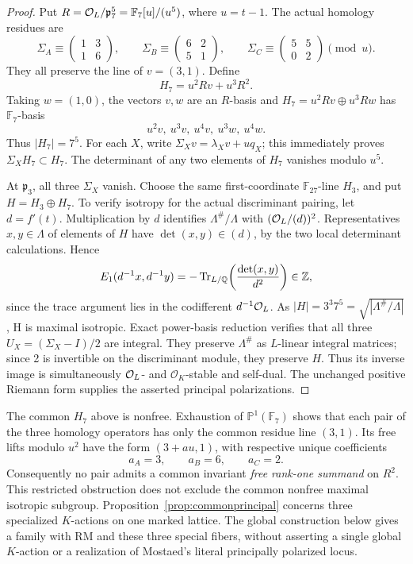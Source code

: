 \begin{proof}
Put $R=\mathcal O_L/\mathfrak p_7^5=\mathbb F_7[u]/(u^5)$, where $u=t-1$.
The actual homology residues are
\[
 \Sigma_A\equiv\begin{pmatrix}1&3\\1&6\end{pmatrix},\qquad
 \Sigma_B\equiv\begin{pmatrix}6&2\\5&1\end{pmatrix},\qquad
 \Sigma_C\equiv\begin{pmatrix}5&5\\0&2\end{pmatrix}\pmod u.
\]
They all preserve the line of $v=(3,1)$. Define
\[
 H_7=u^2Rv+u^3R^2.
\]
Taking $w=(1,0)$, the vectors $v,w$ are an $R$-basis and
$H_7=u^2Rv\oplus u^3Rw$ has $\mathbb F_7$-basis
\[
 u^2v,\ u^3v,\ u^4v,\ u^3w,\ u^4w.
\]
Thus $|H_7|=7^5$.
For each $X$, write $\Sigma_Xv=\lambda_Xv+uq_X$; this immediately proves
$\Sigma_XH_7\subset H_7$. The determinant of any two elements of $H_7$
vanishes modulo $u^5$.

At $\mathfrak p_3$, all three $\Sigma_X$ vanish. Choose the same
first-coordinate $\mathbb F_{27}$-line $H_3$, and put $H=H_3\oplus H_7$.
To verify isotropy for the actual discriminant pairing, let $d=f'(t)$.
Multiplication by $d$ identifies $\Lambda^\#/\Lambda$ with
$(\mathcal O_L/(d))^2$. Representatives $x,y\in\Lambda$ of elements of $H$ have
$\det(x,y)\in(d)$, by the two local determinant calculations. Hence
\[
 E_1(d^{-1}x,d^{-1}y)
 =-\operatorname{Tr}_{L/\mathbb Q}\!\left(\frac{\det(x,y)}{d^2}\right)
 \in\mathbb Z,
\]
since the trace argument lies in the codifferent $d^{-1}\mathcal O_L$.
As $|H|=3^3 7^5=\sqrt{|\Lambda^\#/\Lambda|}$, H is maximal isotropic.
Exact power-basis reduction verifies that all three
$U_X=(\Sigma_X-I)/2$ are integral. They preserve $\Lambda^\#$ as
$L$-linear integral matrices; since 2 is invertible on the discriminant
module, they preserve $H$. Thus its inverse image is simultaneously
$\mathcal O_L$- and $\mathcal O_K$-stable and self-dual. The unchanged positive
Riemann form supplies the asserted principal polarizations.
\end{proof}

\begin{remark}\label{rem:ABprincipallevels}
The common $H_7$ above is nonfree. Exhaustion of $\mathbb P^1(\mathbb F_7)$
shows that each pair of the three homology operators has only the common
residue line $(3,1)$. Its free lifts modulo $u^2$ have the form
$(3+au,1)$, with respective unique coefficients
\[
 a_A=3,\qquad a_B=6,\qquad a_C=2.
\]
Consequently no pair admits a common invariant \emph{free rank-one summand}
on $R^2$. This restricted obstruction does not exclude the common nonfree
maximal isotropic subgroup. Proposition~\ref{prop:commonprincipal} concerns
three specialized $K$-actions on one marked lattice. The global construction
below gives a family with RM and these three special fibers, without
asserting a single global $K$-action or a realization of Mostaed's literal
principally polarized locus.
\end{remark}

